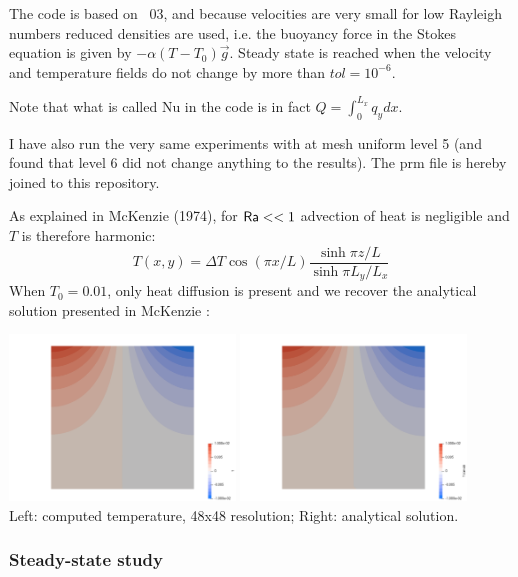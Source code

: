 The code is based on \stone~03, and because velocities are very small for low Rayleigh numbers
reduced densities are used, i.e. the buoyancy force in the Stokes equation is given by $-\alpha(T-T_0)\vec{g}$.
Steady state is reached when the velocity and temperature fields do not change by more than $tol=10^{-6}$.

Note that what is called Nu in the code is in fact $Q=\int_0^{L_x} q_y dx$.

I have also run the very same experiments with \aspect{} at mesh uniform level 5 (and found that 
level 6 did not change anything to the results). The prm file is hereby joined to this repository.

As explained in McKenzie \etal (1974), for ${\mathsf{Ra}} <<1$ advection of heat is negligible and $T$ is therefore harmonic:
\[
T(x,y) = \Delta T \cos (\pi x/L) \frac{\sinh \pi z/L}{\sinh \pi L_y/L_x}
\]
When $T_0=0.01$, only heat diffusion is present and we recover the analytical solution presented in McKenzie \etal:

\begin{center}
\includegraphics[width=6cm]{python_codes/fieldstone_38/results/T0_0p001_32x32/T}
\includegraphics[width=6cm]{python_codes/fieldstone_38/results/T0_0p001_32x32/T_anal}\\
{\captionfont Left: computed temperature, 48x48 resolution; Right: analytical solution.}
\end{center}

\newpage
\subsubsection*{Steady-state study}


